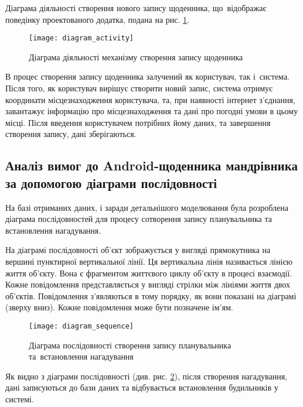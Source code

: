 \documentclass[../main.tex]{subfiles}
\begin{document}

Діаграма діяльності створення нового запису щоденника, що~відображає поведінку проектованого додатка, подана на рис. \ref{diagram:activity}.

\begin{figure}[H]
	\centering
	\texttt{[image: diagram\_activity]}
	\caption{Діаграма діяльності механізму створення запису щоденника}
	\label{diagram:activity}
\end{figure}

В процес створення запису щоденника залучений як користувач, так і~система. Після того, як користувач вирішує створити новий запис, система отримує координати місцезнаходження користувача, та, при наявності інтернет з'єднання, завантажує інформацію про місцезнаходження та дані про погодні умови в цьому місці. Після введення користувачем потрібних йому даних, та завершення створення запису, дані зберігаються.

\subsection{Аналіз вимог до Android-щоденника мандрівника за допомогою діаграми послідовності}
На базі отриманих даних, і заради детальнішого моделювання була розроблена діаграма послідовностей для процесу сотворення запису планувальника та встановлення нагадування.

На діаграмі послідовності об’єкт зображується у вигляді прямокутника на вершині пунктирної вертикальної лінії. Ця вертикальна лінія називається лінією життя об’єкту. Вона є фрагментом життєвого циклу об’єкту в процесі взаємодії. Кожне повідомлення представляється у вигляді стрілки між лініями життя двох об’єктів. Повідомлення з’являються в тому порядку, як вони показані на діаграмі (зверху вниз). Кожне повідомлення може бути позначене ім’ям.


\begin{figure}[H]
	\centering
	\texttt{[image: diagram\_sequence]}
	\caption{Діаграма послідовності створення запису планувальника та~встановлення нагадування} %
	\label{diagram:sequence}
\end{figure}

Як видно з діаграми послідовності (див. рис. \ref{diagram:sequence}), після створення нагадування, дані записуються до бази даних та відбувається встановлення будильників у системі. 
\end{document}
